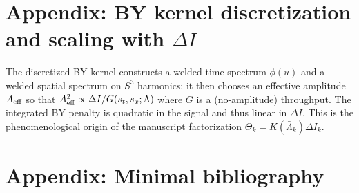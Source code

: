 \documentclass[11pt]{article}
\theoremstyle{definition}
\theoremstyle{plain}
\theoremstyle{remark}
\begin{document}

\def\UOMTransportFragmentLoaded{}





\appendix
\section{Appendix: BY kernel discretization and scaling with $\Delta I$}
\label{app:by-kernel}

The discretized BY kernel constructs a welded time spectrum $\phi(u)$ and a welded spatial spectrum on $S^3$
harmonics; it then chooses an effective amplitude $A_{\rm eff}$ so that
$A_{\rm eff}^2\propto \Delta I/G(s_t,s_x;\Lambda)$ where $G$ is a (no-amplitude) throughput. The integrated BY penalty is
quadratic in the signal and thus linear in $\Delta I$.
This is the phenomenological origin of the manuscript factorization $\Theta_k=K(\bar\Lambda_k)\Delta I_k$.

\section{Appendix: Minimal bibliography}
\label{app:biblio}
\end{document}
